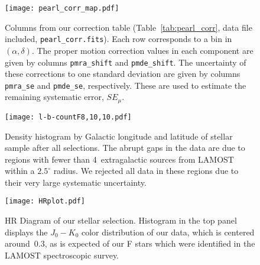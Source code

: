 \documentclass[11pt,preprint]{aastex6}
\begin{document}
\begin{figure}
\centering
\texttt{[image: pearl\_corr\_map.pdf]}
\caption{
	Columns from our correction table (Table~\ref{tab:pearl_corr}, data file included, \texttt{pearl\_corr.fits}). Each row corresponds to a bin in $(\alpha,\delta)$. 
	The proper motion correction values in each component are given by columns \texttt{pmra\_shift} and \texttt{pmde\_shift}. The uncertainty of these corrections to one standard deviation are given by columns \texttt{pmra\_se} and \texttt{pmde\_se}, respectively. These are used to estimate the remaining systematic error, $SE_\mu$.
	\label{fig:pearl_corr_map}
}
\end{figure}

\begin{figure}
\centering
\texttt{[image: l-b-countF8,10,10.pdf]}
\caption{
	Density histogram by Galactic longitude and latitude of stellar sample after all selections.
	The abrupt gaps in the data are due to regions with fewer than 4~extragalactic sources from LAMOST within a $2.5^\circ$ radius. We rejected all data in these regions due to their very large systematic uncertainty.
	\label{fig:star_hist_lb}
}
\end{figure}

\begin{figure}
\centering
\texttt{[image: HRplot.pdf]}
\caption{
	HR Diagram of our stellar selection.
	Histogram in the top panel displays the $J_0 - K_0$ color distribution of our data, which is centered around~0.3, as is expected of our F stars which were identified in the LAMOST spectroscopic survey.
	\label{fig:hrplot}
}
\end{figure}
\end{document}
